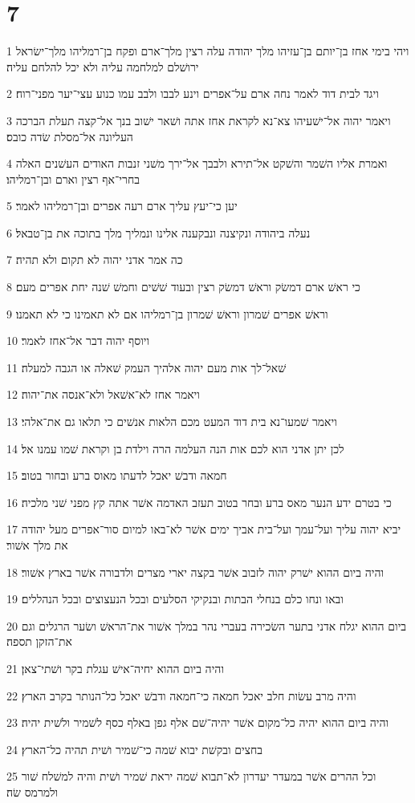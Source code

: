 \chapter{7}

\par 1 ויהי בימי אחז בן־יותם בן־עזיהו מלך יהודה עלה רצין מלך־ארם ופקח בן־רמליהו מלך־ישׂראל ירושׁלם למלחמה עליה ולא יכל להלחם עליה׃
\par 2 ויגד לבית דוד לאמר נחה ארם על־אפרים וינע לבבו ולבב עמו כנוע עצי־יער מפני־רוח׃
\par 3 ויאמר יהוה אל־ישׁעיהו צא־נא לקראת אחז אתה ושׁאר ישׁוב בנך אל־קצה תעלת הברכה העליונה אל־מסלת שׂדה כובס׃
\par 4 ואמרת אליו השׁמר והשׁקט אל־תירא ולבבך אל־ירך משׁני זנבות האודים העשׁנים האלה בחרי־אף רצין וארם ובן־רמליהו׃
\par 5 יען כי־יעץ עליך ארם רעה אפרים ובן־רמליהו לאמר׃
\par 6 נעלה ביהודה ונקיצנה ונבקענה אלינו ונמליך מלך בתוכה את בן־טבאל׃
\par 7 כה אמר אדני יהוה לא תקום ולא תהיה׃
\par 8 כי ראשׁ ארם דמשׂק וראשׁ דמשׂק רצין ובעוד שׁשׁים וחמשׁ שׁנה יחת אפרים מעם׃
\par 9 וראשׁ אפרים שׁמרון וראשׁ שׁמרון בן־רמליהו אם לא תאמינו כי לא תאמנו׃
\par 10 ויוסף יהוה דבר אל־אחז לאמר׃
\par 11 שׁאל־לך אות מעם יהוה אלהיך העמק שׁאלה או הגבה למעלה׃
\par 12 ויאמר אחז לא־אשׁאל ולא־אנסה את־יהוה׃
\par 13 ויאמר שׁמעו־נא בית דוד המעט מכם הלאות אנשׁים כי תלאו גם את־אלהי׃
\par 14 לכן יתן אדני הוא לכם אות הנה העלמה הרה וילדת בן וקראת שׁמו עמנו אל׃
\par 15 חמאה ודבשׁ יאכל לדעתו מאוס ברע ובחור בטוב׃
\par 16 כי בטרם ידע הנער מאס ברע ובחר בטוב תעזב האדמה אשׁר אתה קץ מפני שׁני מלכיה׃
\par 17 יביא יהוה עליך ועל־עמך ועל־בית אביך ימים אשׁר לא־באו למיום סור־אפרים מעל יהודה את מלך אשׁור׃
\par 18 והיה ביום ההוא ישׁרק יהוה לזבוב אשׁר בקצה יארי מצרים ולדבורה אשׁר בארץ אשׁור׃
\par 19 ובאו ונחו כלם בנחלי הבתות ובנקיקי הסלעים ובכל הנעצוצים ובכל הנהללים׃
\par 20 ביום ההוא יגלח אדני בתער השׂכירה בעברי נהר במלך אשׁור את־הראשׁ ושׂער הרגלים וגם את־הזקן תספה׃
\par 21 והיה ביום ההוא יחיה־אישׁ עגלת בקר ושׁתי־צאן׃
\par 22 והיה מרב עשׂות חלב יאכל חמאה כי־חמאה ודבשׁ יאכל כל־הנותר בקרב הארץ׃
\par 23 והיה ביום ההוא יהיה כל־מקום אשׁר יהיה־שׁם אלף גפן באלף כסף לשׁמיר ולשׁית יהיה׃
\par 24 בחצים ובקשׁת יבוא שׁמה כי־שׁמיר ושׁית תהיה כל־הארץ׃
\par 25 וכל ההרים אשׁר במעדר יעדרון לא־תבוא שׁמה יראת שׁמיר ושׁית והיה למשׁלח שׁור ולמרמס שׂה׃

